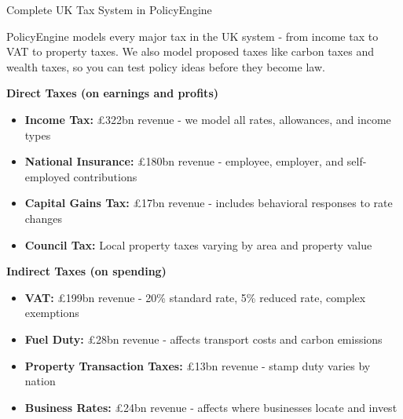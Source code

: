 \documentclass[a4paper,11pt]{article}
\begin{document}
\newpage

\begin{tcolorbox}[
    colback=darkblue,
    colframe=darkblue,
    rounded corners,
    fontupper=\color{white}\Large\bfseries
]
Complete UK Tax System in PolicyEngine
\end{tcolorbox}

\vspace{15pt}

\vspace{20pt}

PolicyEngine models every major tax in the UK system - from income tax to VAT to property taxes. We also model proposed taxes like carbon taxes and wealth taxes, so you can test policy ideas before they become law.

\vspace{15pt}

\begin{tcolorbox}[
    colback=lightgray,
    colframe=mediumblue,
    rounded corners,
    leftrule=3mm,
    rightrule=0mm,
    toprule=0mm,
    bottomrule=0mm
]
\textbf{\color{darkblue}Direct Taxes (on earnings and profits)}

\begin{itemize}[leftmargin=15pt]
\item \textbf{Income Tax:} £322bn revenue - we model all rates, allowances, and income types
\item \textbf{National Insurance:} £180bn revenue - employee, employer, and self-employed contributions
\item \textbf{Capital Gains Tax:} £17bn revenue - includes behavioral responses to rate changes
\item \textbf{Council Tax:} Local property taxes varying by area and property value
\end{itemize}
\end{tcolorbox}

\vspace{15pt}

\begin{tcolorbox}[
    colback=lightgray,
    colframe=mediumblue,
    rounded corners,
    leftrule=3mm,
    rightrule=0mm,
    toprule=0mm,
    bottomrule=0mm
]
\textbf{\color{darkblue}Indirect Taxes (on spending)}

\begin{itemize}[leftmargin=15pt]
\item \textbf{VAT:} £199bn revenue - 20\% standard rate, 5\% reduced rate, complex exemptions
\item \textbf{Fuel Duty:} £28bn revenue - affects transport costs and carbon emissions
\item \textbf{Property Transaction Taxes:} £13bn revenue - stamp duty varies by nation
\item \textbf{Business Rates:} £24bn revenue - affects where businesses locate and invest
\end{itemize}
\end{tcolorbox}
\end{document}
